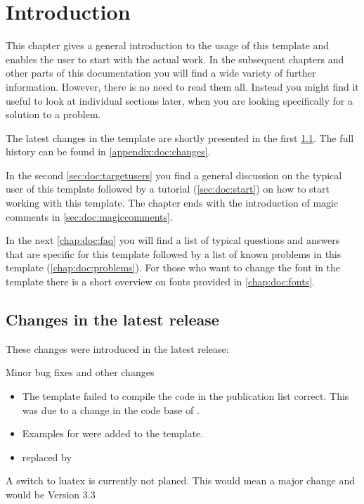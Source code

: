 \chapter{Introduction}

This chapter gives a general introduction to the usage of this template and enables the user to start with the actual work. 
In the subsequent chapters and other parts of this documentation you will find a wide variety of further information. However, there is no need to read them all. Instead you might find it useful to look at individual sections later, when you are looking specifically for a solution to a problem.

The latest changes in the template are shortly presented in the first \cref{sec:doc:changes}. The full history can be found in \cref{appendix:doc:changes}.

In the second \cref{sec:doc:targetusers} you find a general discussion on the typical user of this template followed by a tutorial (\cref{sec:doc:start}) on how to start working with this template. The chapter ends with the introduction of magic comments in \cref{sec:doc:magiccomments}.

In the next \cref{chap:doc:faq} you will find a list of typical questions and answers that are specific for this template followed by a list of known problems in this template (\cref{chap:doc:problems}). For those who want to change the font in the template there is a short overview on fonts provided in \cref{chap:doc:fonts}.
\section{Changes in the latest release}
\label{sec:doc:changes}

These changes were introduced in the latest release:

Minor bug fixes and other changes
\begin{itemize}
	\item The template failed to compile the  code in the publication list correct. This was due to a change in the code base of .
	\item Examples for  were added to the template.
	\item replaced  by 
\end{itemize}
A switch to luatex is currently not planed. This would mean a major change and would be Version 3.3


